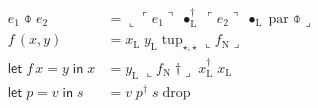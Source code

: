 \documentclass{amsart}
\newcommand{\va}[1]{#1_{\mathrm{N}}}
\newcommand{\lv}[1]{#1_{\mathrm{L}}}
\newcommand{\ch}[2]{#1 \; #2}
\newcommand{\qu}[1]{\ulcorner #1 \urcorner}
\newcommand{\uq}[1]{\llcorner #1 \lrcorner}
\newcommand{\dflt}{\star}
\newcommand{\tmp}{\bullet}
\newcommand{\rev}[1]{#1^\dagger}
\newcommand{\orelse}{\obar}
\begin{document}
\begin{align}
    e_1 \obar e_2 &= \uq{\ch{\qu{e_1}}{\ch{\rev{\lv{\tmp}}}{\ch{\qu{e_2}}{\ch{\lv{\tmp}}{\ch{\mathrm{par}}{\orelse}}}}}} \\
    f\,(x, y) &= \ch{\lv{x}}{\ch{\lv{y}}{\ch{\mathrm{tup}_{\dflt,\dflt}}{\uq{\va{f}}}}} \\
    \mathsf{let}\;f\,x = y\;\mathsf{in}\;x &= \ch{\lv{y}}{\ch{\uq{\ch{\va{f}}{\dagger}}}{\ch{\rev{\lv{x}}}{\lv{x}}}} \\
    \mathsf{let}\;p = v\;\mathsf{in}\;s &= \ch{v}{\ch{\rev{p}}{\ch{s}{\mathrm{drop}}}}
\end{align}
\end{document}
